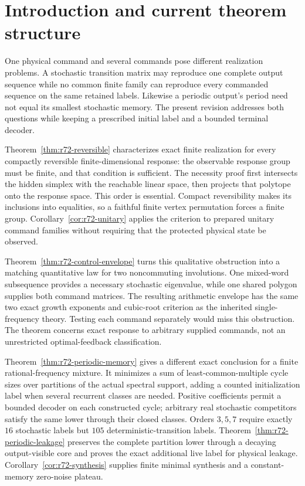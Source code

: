 \section{Introduction and current theorem structure}\label{sec:current-overview}\label{sec:introduction}
One physical command and several commands pose different realization problems. A stochastic transition matrix may reproduce one complete output sequence while no common finite family can reproduce every commanded sequence on the same retained labels. Likewise a periodic output's period need not equal its smallest stochastic memory. The present revision addresses both questions while keeping a prescribed initial label and a bounded terminal decoder.

Theorem~\ref{thm:r72-reversible} characterizes exact finite realization for every compactly reversible finite-dimensional response: the observable response group must be finite, and that condition is sufficient. The necessity proof first intersects the hidden simplex with the reachable linear space, then projects that polytope onto the response space. This order is essential. Compact reversibility makes its inclusions into equalities, so a faithful finite vertex permutation forces a finite group. Corollary~\ref{cor:r72-unitary} applies the criterion to prepared unitary command families without requiring that the protected physical state be observed.

Theorem~\ref{thm:r72-control-envelope} turns this qualitative obstruction into a matching quantitative law for two noncommuting involutions. One mixed-word subsequence provides a necessary stochastic eigenvalue, while one shared polygon supplies both command matrices. The resulting arithmetic envelope has the same two exact growth exponents and cubic-root criterion as the inherited single-frequency theory. Testing each command separately would miss this obstruction. The theorem concerns exact response to arbitrary supplied commands, not an unrestricted optimal-feedback classification.

Theorem~\ref{thm:r72-periodic-memory} gives a different exact conclusion for a finite rational-frequency mixture. It minimizes a sum of least-common-multiple cycle sizes over partitions of the actual spectral support, adding a counted initialization label when several recurrent classes are needed. Positive coefficients permit a bounded decoder on each constructed cycle; arbitrary real stochastic competitors satisfy the same lower through their closed classes. Orders $3,5,7$ require exactly $16$ stochastic labels but $105$ deterministic-transition labels. Theorem~\ref{thm:r72-periodic-leakage} preserves the complete partition lower through a decaying output-visible core and proves the exact additional live label for physical leakage. Corollary~\ref{cor:r72-synthesis} supplies finite minimal synthesis and a constant-memory zero-noise plateau.

